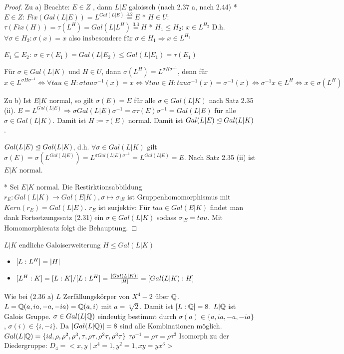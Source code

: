 \documentclass[../main.tex]{subfiles}
\begin{document}
\begin{proof}
    Zu a)
    Beachte: $E\in Z$ , dann $L|E$ galoissch (nach 2.37 a, nach 2.44)
    * $E\in Z$: $Fix(Gal(L|E)) = L^{Gal(L|E)}\overset{3.2}{=} E$
    * $H\in U$: $\tau(Fix(H)) = \tau(L^H) = Gal(L|L^H)\overset{3.3}{=}H$
    * $H_1\leq H_2$: $x\in L^{H_2}$ D.h. $\forall\sigma\in H_2\colon \sigma(x)=x$ also insbesondere für $\sigma\in H_1 \Rightarrow x\in L^{H_1}$

    $E_1\subseteq E_2$: $\sigma \in \tau(E_1) = Gal(L|E_2)\leq Gal(L|E_1)=\tau(E_1)$
    \begin{remark*}
        Für $\sigma\in Gal(L|K)$ und $H\in U$, dann $\sigma(L^H) = L^{\sigma H \sigma^{-1}}$, denn für $x\in L^{\sigma H \sigma^{-1}} \Leftrightarrow \forall tau \in H\colon \sigma tau \sigma^{-1}(x)=x \Leftrightarrow \forall tau \in H\colon tau \sigma^{-1}(x) = \sigma^{-1}(x) \Leftrightarrow \sigma^{-1}x\in L^H \Leftrightarrow x\in \sigma(L^H)$
    \end{remark*}

    Zu b)
    Ist $E|K$ normal, so gilt $\sigma(E) = E$ für alle $\sigma \in Gal(L|K)$ nach Satz 2.35 (ii).
    $E=L^{Gal(L|E)} \Rightarrow \sigma Gal(L|E) \sigma^{-1} = \sigma \tau(E) \sigma^{-1} = Gal(L|E)$ für alle $\sigma \in Gal(L|K)$.
    Damit ist $H:=\tau(E)$ normal.
    Damit ist $Gal(L|E)\trianglelefteq Gal(L|K)$.

    $Gal(L|E) \trianglelefteq Gal(L|K)$, d.h. $\forall \sigma\in Gal(L|K)$ gilt $\sigma(E)=\sigma(L^{Gal(L|E)}) = L^{\sigma Gal(L|E) \sigma^{-1}} = L^{Gal(L|E)} = E$.
    Nach Satz 2.35 (ii) ist $E|K$ normal.

    * Sei $E|K$ normal. Die Restirktionsabbildung $r_E: Gal(L|K) \rightarrow Gal(E|K), \sigma \mapsto \sigma_{|E}$ ist Gruppenhomomorphismus mit $Kern(r_E) = Gal(L|E)$.
    $r_E$ ist surjektiv:
    Für $tau\in Gal(E|K)$ findet man dank Fortsetzungssatz (2.31) ein $\sigma \in Gal(L|K)$ sodass $\sigma_{|E}=tau$.
    Mit Homomorphiesatz folgt die Behauptung.
\end{proof}
\begin{remark}
    $L|K$ endliche Galoiserweiterung $H\leq Gal(L|K)$
    \begin{itemize}
        \item $[L:L^H] = \left\vert H \right\vert$
        \item $[L^H:K] = [L:K]/[L:L^H] = \frac{\left\vert Gal(L|K) \right\vert}{\left\vert H \right\vert} = [Gal(L|K):H]$
    \end{itemize}
\end{remark}
\begin{example}
    Wie bei (2.36 a)
    $L$ Zerfällungskörper von $X^4-2$ über $\mathbb{Q}$.
    $L = \mathbb{Q}(a, ia, -a, -ia) = \mathbb{Q}(a,i)$ mit $a=\sqrt[4]{2}$.
    Damit ist $[L:\mathbb{Q}] = 8$.
    $L|\mathbb{Q}$ ist Galois Gruppe.
    $\sigma\in Gal(L|\mathbb{Q})$ eindeutig bestimmt durch $\sigma(a)\in \{a,ia,-a,-ia\}$, $\sigma(i)\in \{i,-i\}$.
    Da $\left\vert Gal(L|\mathbb{Q}) \right\vert = 8$ sind alle Kombinationen möglich.
    \TODO[Graphik]
    $Gal(L|\mathbb{Q}) = \{id,\rho,\rho^2,\rho^3,\tau,\rho\tau,\rho^2\tau,\rho^3\tau\}$ %
    $\tau\rho^{-1}=\rho \tau = \rho\tau^3$ %
    Isomorph zu der Diedergruppe:
    $D_4 = <x,y\mid x^4=1, y^2=1,xy=yx^3>$
\end{example}
\end{document}
